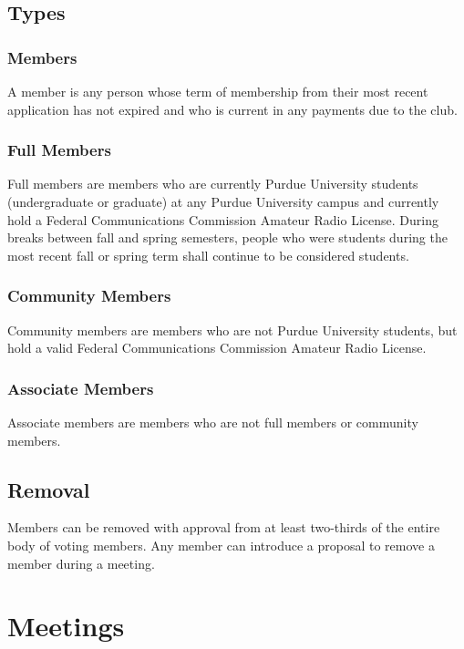 \documentclass{article}
\begin{document}
\subsection{Types}

\subsubsection{Members}

A member is any person whose term of membership from their most recent
application has not expired and who is current in any payments due to the club.

\subsubsection{Full Members}

Full members are members who are currently Purdue University students
(undergraduate or graduate) at any Purdue University campus and currently hold a
Federal Communications Commission Amateur Radio License. During breaks between
fall and spring semesters, people who were students during the most recent fall
or spring term shall continue to be considered students.

\subsubsection{Community Members}

Community members are members who are not Purdue University students, but hold a
valid Federal Communications Commission Amateur Radio License.

\subsubsection{Associate Members}

Associate members are members who are not full members or community members.

\subsection{Removal}

Members can be removed with approval from at least two-thirds of the entire body
of voting members. Any member can introduce a proposal to remove a member during
a meeting.

\section{Meetings}
\end{document}

